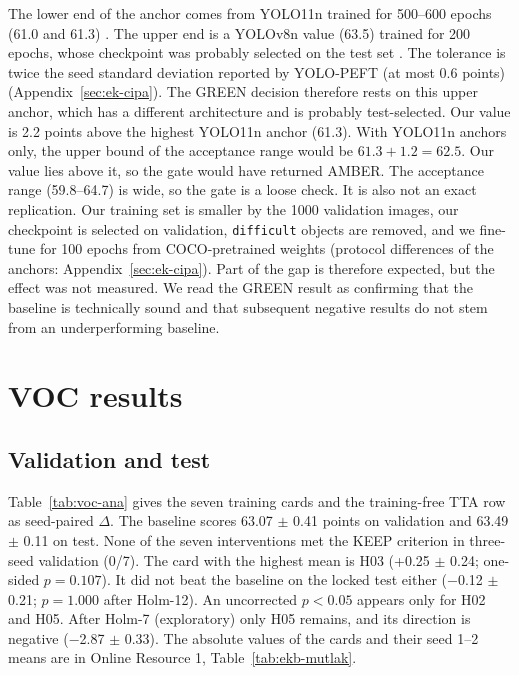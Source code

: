 \documentclass[pdflatex,iicol,sn-mathphys-num]{sn-jnl}
\begin{document}
The lower end of the anchor comes from YOLO11n trained for 500--600 epochs (61.0 and 61.3) \cite{zhang_2025_adlyolo,lin_2025_yolomaster}. The upper end is a YOLOv8n value (63.5) trained for 200 epochs, whose checkpoint was probably selected on the test set \cite{elhamdouni_2025_yolov8nvoc}. The tolerance is twice the seed standard deviation reported by YOLO-PEFT (at most 0.6 points) \cite{lin_2026_yolopeft} (Appendix~\ref{sec:ek-cipa}). The GREEN decision therefore rests on this upper anchor, which has a different architecture and is probably test-selected. Our value is 2.2 points above the highest YOLO11n anchor (61.3). With YOLO11n anchors only, the upper bound of the acceptance range would be $61.3+1.2=62.5$. Our value lies above it, so the gate would have returned AMBER. The acceptance range (59.8--64.7) is wide, so the gate is a loose check. It is also not an exact replication. Our training set is smaller by the 1000 validation images, our checkpoint is selected on validation, \texttt{difficult} objects are removed, and we fine-tune for 100 epochs from COCO-pretrained weights (protocol differences of the anchors: Appendix~\ref{sec:ek-cipa}). Part of the gap is therefore expected, but the effect was not measured. We read the GREEN result as confirming that the baseline is technically sound and that subsequent negative results do not stem from an underperforming baseline.

\section{VOC results}\label{sec:bulgular}



\subsection{Validation and test}\label{sec:bulgu-sira}\label{sec:bulgu-ablasyon}
Table~\ref{tab:voc-ana} gives the seven training cards and the training-free TTA row as seed-paired $\Delta$. The baseline scores 63.07 $\pm$ 0.41 points on validation and 63.49 $\pm$ 0.11 on test. None of the seven interventions met the KEEP criterion in three-seed validation (0/7). The card with the highest mean is H03 (+0.25 $\pm$ 0.24; one-sided $p=0.107$). It did not beat the baseline on the locked test either ($-$0.12 $\pm$ 0.21; $p=1.000$ after Holm-12). An uncorrected $p<0.05$ appears only for H02 and H05. After Holm-7 (exploratory) only H05 remains, and its direction is negative ($-$2.87 $\pm$ 0.33). The absolute values of the cards and their seed 1--2 means are in Online Resource 1, Table~\ref{tab:ekb-mutlak}.
\end{document}
